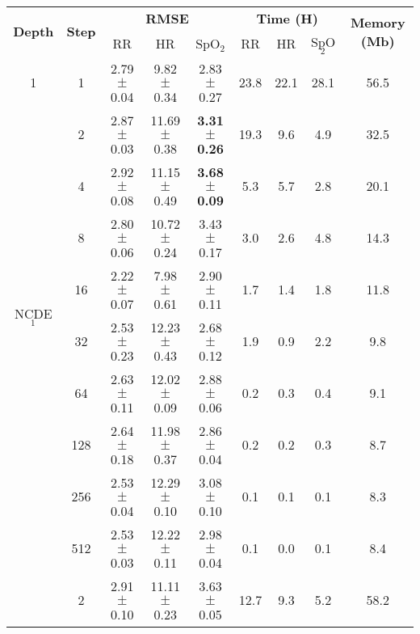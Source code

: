 \begin{table}[t]
    \small
    \begin{center}
        \begin{tabular}{ccccccccc}
        \toprule
        \multirow{2}{*}{\textbf{Depth}} & \multirow{2}{*}{\textbf{Step}} & \multicolumn{3}{c}{\textbf{RMSE}} & \multicolumn{3}{c}{\textbf{Time (H)}} & \multirow{2}{*}{\textbf{Memory (Mb)}} \\
        \cmidrule(lr){3-5} \cmidrule(lr){6-8}
         & & RR & HR & SpO$_2$ & RR & HR & SpO$_2$ & \\
        \midrule
        1 & 1   &  2.79 $\pm$ 0.04 &   9.82 $\pm$ 0.34 &  2.83 $\pm$ 0.27 &          23.8 &          22.1 &          28.1 &               56.5 \\
          & 2   &  2.87 $\pm$ 0.03 &  11.69 $\pm$ 0.38 &  \textbf{3.31 $\pm$ 0.26} &          19.3 &           9.6 &           4.9 &               32.5 \\
          & 4   &  2.92 $\pm$ 0.08 &  11.15 $\pm$ 0.49 &  \textbf{3.68 $\pm$ 0.09} &           5.3 &           5.7 &           2.8 &               20.1 \\
          & 8   &  2.80 $\pm$ 0.06 &  10.72 $\pm$ 0.24 &  3.43 $\pm$ 0.17 &           3.0 &           2.6 &           4.8 &               14.3 \\
        \multirow{2}{*}{NCDE$_1$}  & 16  &  2.22 $\pm$ 0.07 &   7.98 $\pm$ 0.61 &   2.90 $\pm$ 0.11 &           1.7 &           1.4 &           1.8 &               11.8 \\
          & 32  &  2.53 $\pm$ 0.23 &  12.23 $\pm$ 0.43 &  2.68 $\pm$ 0.12 &           1.9 &           0.9 &           2.2 &                9.8 \\
          & 64  &  2.63 $\pm$ 0.11 &  12.02 $\pm$ 0.09 &  2.88 $\pm$ 0.06 &           0.2 &           0.3 &           0.4 &                9.1 \\
          & 128 &  2.64 $\pm$ 0.18 &  11.98 $\pm$ 0.37 &  2.86 $\pm$ 0.04 &           0.2 &           0.2 &           0.3 &                8.7 \\
          & 256 &  2.53 $\pm$ 0.04 &  12.29 $\pm$ 0.10 &  3.08 $\pm$ 0.10 &           0.1 &           0.1 &           0.1 &                8.3 \\
          & 512 &  2.53 $\pm$ 0.03 &  12.22 $\pm$ 0.11 &  2.98 $\pm$ 0.04 &           0.1 &           0.0 &           0.1 &                8.4 \\
        \midrule
          & 2   &   2.91 $\pm$ 0.10 &  11.11 $\pm$ 0.23 &  3.63 $\pm$ 0.05 &          12.7 &           9.3 &           5.2 &               58.2 \\

\end{tabular}
\end{center}
\end{table}
